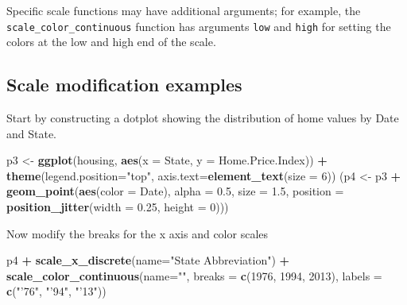 \documentclass[]{book}
\newenvironment{Shaded}{\begin{snugshade}}{\end{snugshade}}
\newcommand{\KeywordTok}[1]{\textcolor[rgb]{0.13,0.29,0.53}{\textbf{#1}}}
\newcommand{\DataTypeTok}[1]{\textcolor[rgb]{0.13,0.29,0.53}{#1}}
\newcommand{\DecValTok}[1]{\textcolor[rgb]{0.00,0.00,0.81}{#1}}
\newcommand{\FloatTok}[1]{\textcolor[rgb]{0.00,0.00,0.81}{#1}}
\newcommand{\StringTok}[1]{\textcolor[rgb]{0.31,0.60,0.02}{#1}}
\newcommand{\OperatorTok}[1]{\textcolor[rgb]{0.81,0.36,0.00}{\textbf{#1}}}
\newcommand{\NormalTok}[1]{#1}
\begin{document}
Specific scale functions may have additional arguments; for example, the
\texttt{scale\_color\_continuous} function has arguments \texttt{low}
and \texttt{high} for setting the colors at the low and high end of the
scale.

\subsection{Scale modification
examples}\label{scale-modification-examples}

Start by constructing a dotplot showing the distribution of home values
by Date and State.

\begin{Shaded}
\begin{Highlighting}[]
\NormalTok{p3 <-}\StringTok{ }\KeywordTok{ggplot}\NormalTok{(housing,}
             \KeywordTok{aes}\NormalTok{(}\DataTypeTok{x =}\NormalTok{ State,}
                 \DataTypeTok{y =}\NormalTok{ Home.Price.Index)) }\OperatorTok{+}\StringTok{ }
\StringTok{        }\KeywordTok{theme}\NormalTok{(}\DataTypeTok{legend.position=}\StringTok{"top"}\NormalTok{,}
              \DataTypeTok{axis.text=}\KeywordTok{element_text}\NormalTok{(}\DataTypeTok{size =} \DecValTok{6}\NormalTok{))}
\NormalTok{(p4 <-}\StringTok{ }\NormalTok{p3 }\OperatorTok{+}\StringTok{ }\KeywordTok{geom_point}\NormalTok{(}\KeywordTok{aes}\NormalTok{(}\DataTypeTok{color =}\NormalTok{ Date),}
                       \DataTypeTok{alpha =} \FloatTok{0.5}\NormalTok{,}
                       \DataTypeTok{size =} \FloatTok{1.5}\NormalTok{,}
                       \DataTypeTok{position =} \KeywordTok{position_jitter}\NormalTok{(}\DataTypeTok{width =} \FloatTok{0.25}\NormalTok{, }\DataTypeTok{height =} \DecValTok{0}\NormalTok{)))}
\end{Highlighting}
\end{Shaded}

Now modify the breaks for the x axis and color scales

\begin{Shaded}
\begin{Highlighting}[]
\NormalTok{p4 }\OperatorTok{+}\StringTok{ }\KeywordTok{scale_x_discrete}\NormalTok{(}\DataTypeTok{name=}\StringTok{"State Abbreviation"}\NormalTok{) }\OperatorTok{+}
\StringTok{  }\KeywordTok{scale_color_continuous}\NormalTok{(}\DataTypeTok{name=}\StringTok{""}\NormalTok{,}
                         \DataTypeTok{breaks =} \KeywordTok{c}\NormalTok{(}\DecValTok{1976}\NormalTok{, }\DecValTok{1994}\NormalTok{, }\DecValTok{2013}\NormalTok{),}
                         \DataTypeTok{labels =} \KeywordTok{c}\NormalTok{(}\StringTok{"'76"}\NormalTok{, }\StringTok{"'94"}\NormalTok{, }\StringTok{"'13"}\NormalTok{))}
\end{Highlighting}
\end{Shaded}
\end{document}
